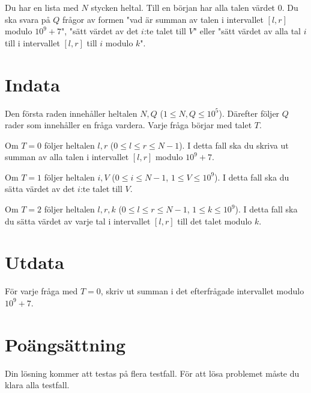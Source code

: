 Du har en lista med $N$ stycken heltal. Till en början har alla talen värdet $0$. Du ska svara på $Q$
frågor av formen "vad är summan av talen i intervallet $[l,r]$ modulo $10^9+7$",
"sätt värdet av det $i$:te talet till $V$" eller "sätt värdet av alla tal $i$ till i intervallet $[l,r]$
till $i$ modulo $k$".

\section*{Indata}
Den första raden innehåller heltalen $N, Q$ ($1 \leq N, Q \leq 10^5$).
Därefter följer $Q$ rader som innehåller en fråga vardera. Varje fråga börjar med talet $T$.

Om $T=0$ följer heltalen $l,r$ ($0 \leq l \leq r \leq N - 1$). I detta fall ska du skriva ut summan av alla talen i intervallet $[l,r]$ modulo $10^9+7$.

Om $T=1$ följer heltalen $i, V$ ($0 \leq i \leq N - 1$, $1 \leq V \leq 10^9$). I detta fall ska du sätta värdet av det $i$:te talet till $V$.

Om $T=2$ följer heltalen $l,r,k$ ($0 \leq l \leq r \leq N-1$, $1 \leq k \leq 10^9$). I detta fall ska du sätta värdet av varje tal i intervallet $[l,r]$ till det talet modulo $k$.

\section*{Utdata}
För varje fråga med $T=0$, skriv ut summan i det efterfrågade intervallet modulo $10^9+7$.

\section*{Poängsättning}
Din lösning kommer att testas på flera testfall.
\noindent
För att lösa problemet måste du klara alla testfall.

